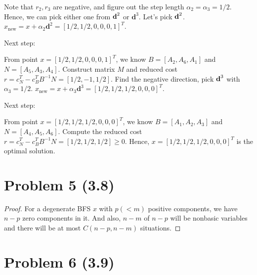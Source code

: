 \documentclass[12pt]{article}
\begin{document}
Note that $r_2, r_3$ are negative, and figure out the step length $\alpha_2 = \alpha_3 = 1/2$. Hence, we can pick either one from $\textbf d^2$ or $\textbf{d}^3$. Let's pick $\textbf d^2$. $x_{\text{new}} = x + \alpha_2\textbf{d}^2 = [1/2,1/2,0,0,0,1]^T$. 

Next step:

From point $x =  [1/2,1/2,0,0,0,1]^T$, we know $B = [A_2, A_6, A_1]$ and $N = [A_5, A_3, A_4]$. Construct matrix $M$ and reduced cost $r = c_N^T - c_B^TB^{-1}N = [1/2, -1, 1/2]$. Find the negative direction, pick $\textbf d^3$ with $\alpha_3 = 1/2$. $x_{\text{new}} = x + \alpha_3\textbf{d}^3 =  [1/2, 1/2, 1/2, 0, 0, 0]^T$.

Next step:

From point $x = [1/2, 1/2, 1/2, 0, 0, 0]^T$, we know $B = [A_1, A_2, A_3]$ and $N = [A_4, A_5, A_6]$. Compute the reduced cost $r = c_N^T - c_B^TB^{-1}N = [1/2, 1/2, 1/2]  \geqslant 0$. Hence, $x = [1/2, 1/2, 1/2, 0, 0, 0]^T$ is the optimal solution.



\section*{Problem 5 (3.8)}

\begin{proof}

For a degenerate BFS $x$ with $p(<m)$ positive components, we have $n-p$ zero components in it. And also, $n-m$ of $n-p$ will be nonbasic variables and there will be at most $C(n-p, n-m)$ situations. 

\end{proof}


\section*{Problem 6 (3.9)}
\end{document}
